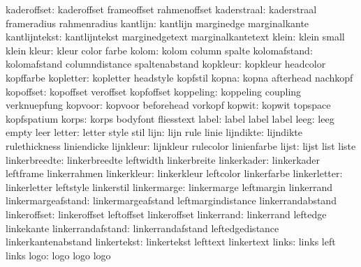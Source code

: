          kaderoffset:  kaderoffset          frameoffset          rahmenoffset
         kaderstraal:  kaderstraal          frameradius          rahmenradius
            kantlijn:  kantlijn             marginedge           marginalkante
       kantlijntekst:  kantlijntekst        marginedgetext       marginalkantetext
               klein:  klein                small                klein
               kleur:  kleur                color                farbe
               kolom:  kolom                column               spalte
        kolomafstand:  kolomafstand         columndistance       spaltenabstand
            kopkleur:  kopkleur             headcolor            kopffarbe
           kopletter:  kopletter            headstyle            kopfstil
               kopna:  kopna                afterhead            nachkopf
           kopoffset:  kopoffset            veroffset            kopfoffset
           koppeling:  koppeling            coupling             verknuepfung
             kopvoor:  kopvoor              beforehead           vorkopf
              kopwit:  kopwit               topspace             kopfspatium
               korps:  korps                bodyfont             fliesstext
               label:  label                label                label
                leeg:  leeg                 empty                leer
              letter:  letter               style                stil
                lijn:  lijn                 rule                 linie
           lijndikte:  lijndikte            rulethickness        liniendicke
           lijnkleur:  lijnkleur            rulecolor            linienfarbe
               lijst:  lijst                list                 liste
       linkerbreedte:  linkerbreedte        leftwidth            linkerbreite
         linkerkader:  linkerkader          leftframe            linkerrahmen
         linkerkleur:  linkerkleur          leftcolor            linkerfarbe
        linkerletter:  linkerletter         leftstyle            linkerstil
         linkermarge:  linkermarge          leftmargin           linkerrand
  linkermargeafstand:  linkermargeafstand   leftmargindistance   linkerrandabstand
        linkeroffset:  linkeroffset         leftoffset           linkeroffset
          linkerrand:  linkerrand           leftedge             linkekante
   linkerrandafstand:  linkerrandafstand    leftedgedistance     linkerkantenabstand
         linkertekst:  linkertekst          lefttext             linkertext
               links:  links                left                 links
                logo:  logo                 logo                 logo
